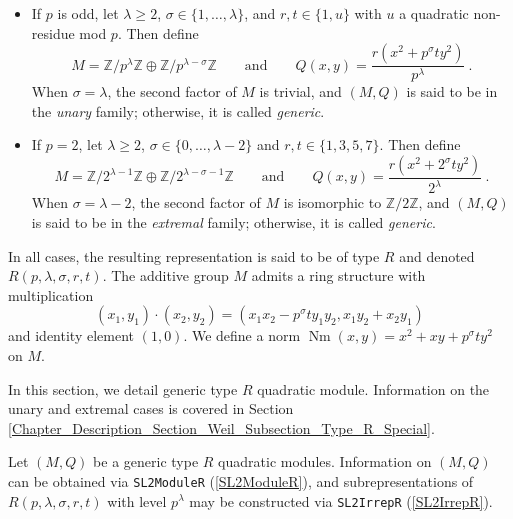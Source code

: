\documentclass[a4paper,11pt]{report}
\begin{document}
{{{ 
\begin{itemize}
\item If $p$ is odd, let $\lambda \geq 2$, $\sigma \in \{1, \dots, \lambda\}$, and $r,t \in \{1,u\}$ with $u$ a quadratic non-residue mod $p$. Then define 
\[M = \mathbb{Z}/p^\lambda\mathbb{Z} \oplus
\mathbb{Z}/p^{\lambda-\sigma}\mathbb{Z} \qquad \text{and} \qquad Q(x,y) =
\frac{r(x^2 + p^\sigma t y^2)}{p^\lambda}~.\]
 When $\sigma = \lambda$, the second factor of $M$ is trivial, and $(M,Q)$ is said to be in the \emph{unary} family; otherwise, it is called \emph{generic}.
\item If $p=2$, let $\lambda \geq 2$, $\sigma \in \{0, \dots, \lambda-2\}$ and $r,t \in \{1,3,5,7\}$. Then define 
\[M = \mathbb{Z}/2^{\lambda-1}\mathbb{Z} \oplus
\mathbb{Z}/2^{\lambda-\sigma-1}\mathbb{Z} \qquad \text{and} \qquad Q(x,y) =
\frac{r(x^2 + 2^\sigma t y^2)}{2^\lambda}~.\]
 When $\sigma = \lambda - 2$, the second factor of $M$ is isomorphic to $\mathbb{Z}/2\mathbb{Z}$, and $(M,Q)$ is said to be in the \emph{extremal} family; otherwise, it is called \emph{generic}.
\end{itemize}
 

 In all cases, the resulting representation is said to be of type $R$ and denoted $R(p,\lambda,\sigma,r,t)$. The additive group $M$ admits a ring structure with multiplication 
\[(x_1, y_1) \cdot (x_2, y_2) = (x_1x_2 - p^\sigma ty_1y_2, x_1y_2 + x_2y_1)\]
 and identity element $(1,0)$. We define a norm $\operatorname{Nm}(x,y) = x^2 + xy + p^\sigma t y^2$ on $M$. 

 In this section, we detail generic type $R$ quadratic module. Information on the unary and extremal cases is covered in
Section \ref{Chapter_Description_Section_Weil_Subsection_Type_R_Special}. 

 Let $(M,Q)$ be a generic type $R$ quadratic modules. Information on $(M,Q)$ can be obtained via \texttt{SL2ModuleR} (\ref{SL2ModuleR}), and subrepresentations of $R(p,\lambda,\sigma,r,t)$ with level $p^\lambda$ may be constructed via \texttt{SL2IrrepR} (\ref{SL2IrrepR}). 

}}}
\end{document}
